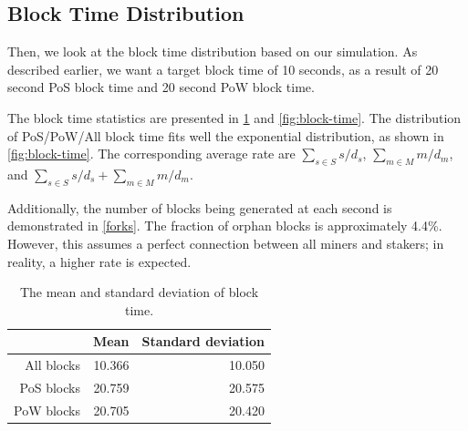 \documentclass[a4paper]{article}
\begin{document}
\subsection{Block Time Distribution}

Then, we look at the block time distribution based on our simulation. As described earlier, we want a target block time of 10 seconds, as a result of 20 second PoS block time and 20 second PoW block time.

The block time statistics are presented in \cref{table:block-time} and \cref{fig:block-time}. The distribution of PoS/PoW/All block time fits well the exponential distribution, as shown in \cref{fig:block-time}. The corresponding average rate are $\sum_{s \in S}{s} / d_s$, $\sum_{m \in M}{m} / d_m$, and $\sum_{s \in S}{s} / d_s + \sum_{m \in M}{m} / d_m$.

Additionally, the number of blocks being generated at each second is demonstrated in \cref{forks}. The fraction of orphan blocks is approximately 4.4\%. However, this assumes a perfect connection between all miners and stakers; in reality, a higher rate is expected.

\begin{table}
\centering
\begin{tabular}{@{}rrr@{}}
\toprule
& Mean & Standard deviation \\ \midrule
All blocks & 10.366 & 10.050 \\
PoS blocks & 20.759 & 20.575 \\
PoW blocks & 20.705 & 20.420 \\
\bottomrule

\end{tabular}
\caption{The mean and standard deviation of block time.}
\label{table:block-time}
\end{table}
\end{document}
